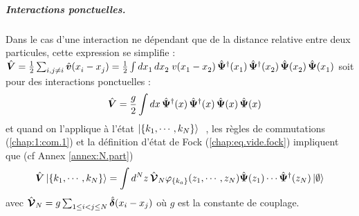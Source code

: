 \begin{mdframed}[
	linewidth=0.5pt, 
	backgroundcolor=gray!5, 
	roundcorner=50pt,	
	innerleftmargin=5pt,
    innerrightmargin=5pt,
    innertopmargin=-10pt,
    innerbottommargin=2pt,
    leftmargin=2pt,
    rightmargin=2pt
	]
\subparagraph{Interactions ponctuelles.} 
Dans le cas d’une interaction ne dépendant que de la distance relative entre deux particules, cette expression se simplifie :
\(
     \hat{\bm{V}} = \frac{1}{2} \sum_{i, j \ne i}  \hat{\bm{v}}(x_i^{} - x_j^{}) = 
    \frac{1}{2} \int dx_1^{} \, dx_2^{} \; v(x_1^{} - x_2^{}) \,
    \hat{\bm{\Psi}}^\dagger(x_1^{}) \, \hat{\bm{\Psi}}^\dagger(x_2^{}) \, 
    \hat{\bm{\Psi}}(x_2^{}) \, \hat{\bm{\Psi}}(x_1^{})
    \label{eq:V_local}
\) soit pour des interactions ponctuelles :	
\begin{eqnarray}
	\quad \hat{\bm{V}}  = \frac{g}{2} \int dx \,
    \hat{\bm{\Psi}}^\dagger(x) \, \hat{\bm{\Psi}}^\dagger(x) \, 
    \hat{\bm{\Psi}}(x) \, \hat{\bm{\Psi}}(x)  		
\end{eqnarray}
et quand on l'applique à l'état $\ket{\{k_1 , \cdots , k_N\}} $ , les règles de commutations (\ref{chap:1:com.1}) et la définition d'état de Fock (\ref{chap:eq.vide.fock}) impliquent que (cf Annex \ref{annex:N.part})
\begin{eqnarray}
\hat{\bm{V}}\ket{\{k_1 , \cdots , k_N\}} =  \int d^Nz \, \hat{\bm{\mathcal{V}}}_N \varphi_{\{k_a\}}(z_1 , \cdots , z_N )\hat{\bm{\Psi}}(z_1)\cdots \hat{\bm{\Psi}}^\dag(z_N) \ket{\emptyset} 
\end{eqnarray}
avec 
\(
	\hat{\bm{\mathcal{V}}}_N 	
 = g\sum_{1\leq i < j \leq N } \hat{\bm{\delta}}(x_i - x_j)	
\)
où \( g \) est la constante de couplage.
\end{mdframed}






